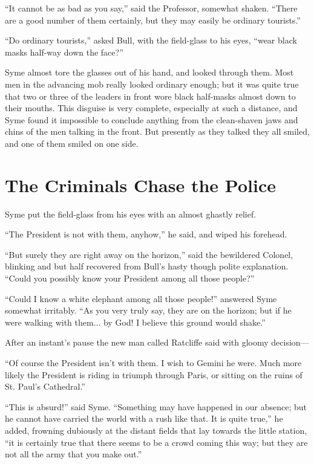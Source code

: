 \documentclass{book}
\begin{document}
“It cannot be as bad as you say,” said the Professor, somewhat shaken. “There are a good number of them certainly, but they may easily be ordinary tourists.”

“Do ordinary tourists,” asked Bull, with the field-glass to his eyes, “wear black masks half-way down the face?”

Syme almost tore the glasses out of his hand, and looked through them. Most men in the advancing mob really looked ordinary enough; but it was quite true that two or three of the leaders in front wore black half-masks almost down to their mouths. This disguise is very complete, especially at such a distance, and Syme found it impossible to conclude anything from the clean-shaven jaws and chins of the men talking in the front. But presently as they talked they all smiled, and one of them smiled on one side.

\chapter{The Criminals Chase the Police}
\label{chapter-10}
Syme put the field-glass from his eyes with an almost ghastly relief.

“The President is not with them, anyhow,” he said, and wiped his forehead.

“But surely they are right away on the horizon,” said the bewildered Colonel, blinking and but half recovered from Bull’s hasty though polite explanation. “Could you possibly know your President among all those people?”

“Could I know a white elephant among all those people!” answered Syme somewhat irritably. “As you very truly say, they are on the horizon; but if he were walking with them... by God! I believe this ground would shake.”

After an instant’s pause the new man called Ratcliffe said with gloomy decision—

“Of course the President isn’t with them. I wish to Gemini he were. Much more likely the President is riding in triumph through Paris, or sitting on the ruins of St. Paul’s Cathedral.”

“This is absurd!” said Syme. “Something may have happened in our absence; but he cannot have carried the world with a rush like that. It is quite true,” he added, frowning dubiously at the distant fields that lay towards the little station, “it is certainly true that there seems to be a crowd coming this way; but they are not all the army that you make out.”
\end{document}
